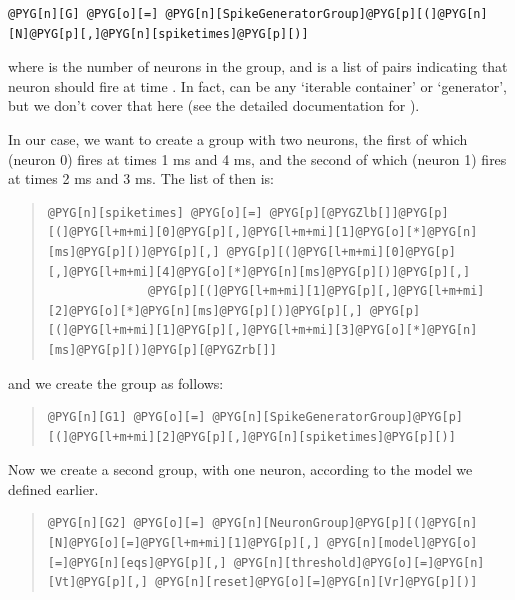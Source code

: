 \documentclass[letterpaper,10pt,english]{manual}
\begin{document}
\begin{Verbatim}[commandchars=@\[\]]
@PYG[n][G] @PYG[o][=] @PYG[n][SpikeGeneratorGroup]@PYG[p][(]@PYG[n][N]@PYG[p][,]@PYG[n][spiketimes]@PYG[p][)]
\end{Verbatim}

where  is the number of neurons in the group, and  is a
list of pairs  indicating that neuron  should fire at time .
In fact,  can be any `iterable container' or `generator',
but we don't cover that here (see the detailed documentation for
\hyperlink{brian.SpikeGeneratorGroup}{}).

In our case, we want to create a group with two neurons, the first
of which (neuron 0) fires at times 1 ms and 4 ms, and the second
of which (neuron 1) fires at times 2 ms and 3 ms. The list of
 then is:
\begin{quote}

\begin{Verbatim}[commandchars=@\[\]]
@PYG[n][spiketimes] @PYG[o][=] @PYG[p][@PYGZlb[]]@PYG[p][(]@PYG[l+m+mi][0]@PYG[p][,]@PYG[l+m+mi][1]@PYG[o][*]@PYG[n][ms]@PYG[p][)]@PYG[p][,] @PYG[p][(]@PYG[l+m+mi][0]@PYG[p][,]@PYG[l+m+mi][4]@PYG[o][*]@PYG[n][ms]@PYG[p][)]@PYG[p][,]
              @PYG[p][(]@PYG[l+m+mi][1]@PYG[p][,]@PYG[l+m+mi][2]@PYG[o][*]@PYG[n][ms]@PYG[p][)]@PYG[p][,] @PYG[p][(]@PYG[l+m+mi][1]@PYG[p][,]@PYG[l+m+mi][3]@PYG[o][*]@PYG[n][ms]@PYG[p][)]@PYG[p][@PYGZrb[]]
\end{Verbatim}
\end{quote}

and we create the group as follows:
\begin{quote}

\begin{Verbatim}[commandchars=@\[\]]
@PYG[n][G1] @PYG[o][=] @PYG[n][SpikeGeneratorGroup]@PYG[p][(]@PYG[l+m+mi][2]@PYG[p][,]@PYG[n][spiketimes]@PYG[p][)]
\end{Verbatim}
\end{quote}

Now we create a second group, with one neuron, according to the
model we defined earlier.
\begin{quote}

\begin{Verbatim}[commandchars=@\[\]]
@PYG[n][G2] @PYG[o][=] @PYG[n][NeuronGroup]@PYG[p][(]@PYG[n][N]@PYG[o][=]@PYG[l+m+mi][1]@PYG[p][,] @PYG[n][model]@PYG[o][=]@PYG[n][eqs]@PYG[p][,] @PYG[n][threshold]@PYG[o][=]@PYG[n][Vt]@PYG[p][,] @PYG[n][reset]@PYG[o][=]@PYG[n][Vr]@PYG[p][)]
\end{Verbatim}
\end{quote}
\end{document}
